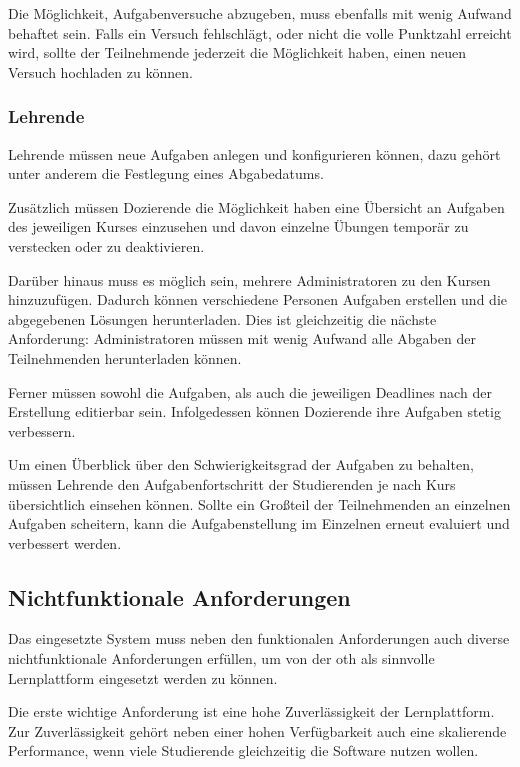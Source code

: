 Die Möglichkeit, Aufgabenversuche abzugeben, muss ebenfalls mit wenig Aufwand
behaftet sein. Falls ein Versuch fehlschlägt, oder nicht die volle Punktzahl
erreicht wird, sollte der Teilnehmende jederzeit die Möglichkeit haben, einen
neuen Versuch hochladen zu können.

\subsubsection{Lehrende}\label{anforderungsanalyse-funktional-lehrende}
Lehrende müssen neue Aufgaben anlegen und konfigurieren können, dazu gehört
unter anderem die Festlegung eines Abgabedatums.

Zusätzlich müssen Dozierende die Möglichkeit haben eine Übersicht an Aufgaben
des jeweiligen Kurses einzusehen und davon einzelne Übungen temporär zu
verstecken oder zu deaktivieren.

Darüber hinaus muss es möglich sein, mehrere Administratoren zu den Kursen
hinzuzufügen. Dadurch können verschiedene Personen Aufgaben erstellen und die
abgegebenen Lösungen herunterladen. Dies ist gleichzeitig die nächste
Anforderung: Administratoren müssen mit wenig Aufwand alle Abgaben der
Teilnehmenden herunterladen können.

Ferner müssen sowohl die Aufgaben, als auch die jeweiligen Deadlines nach der
Erstellung editierbar sein. Infolgedessen können Dozierende ihre Aufgaben stetig
verbessern.

Um einen Überblick über den Schwierigkeitsgrad der Aufgaben zu behalten, müssen
Lehrende den Aufgabenfortschritt der Studierenden je nach Kurs übersichtlich
einsehen können. Sollte ein Großteil der Teilnehmenden an einzelnen Aufgaben
scheitern, kann die Aufgabenstellung im Einzelnen erneut evaluiert und
verbessert werden.

\newpage

\subsection{Nichtfunktionale Anforderungen}
\label{anforderungsanalyse-nichtfunktional}
Das eingesetzte System muss neben den funktionalen Anforderungen auch diverse
nichtfunktionale Anforderungen erfüllen, um von der \acs{oth} als sinnvolle
Lernplattform eingesetzt werden zu können.

Die erste wichtige Anforderung ist eine hohe Zuverlässigkeit der Lernplattform.
Zur Zuverlässigkeit gehört neben einer hohen Verfügbarkeit auch eine skalierende
Performance, wenn viele Studierende gleichzeitig die Software nutzen wollen.

